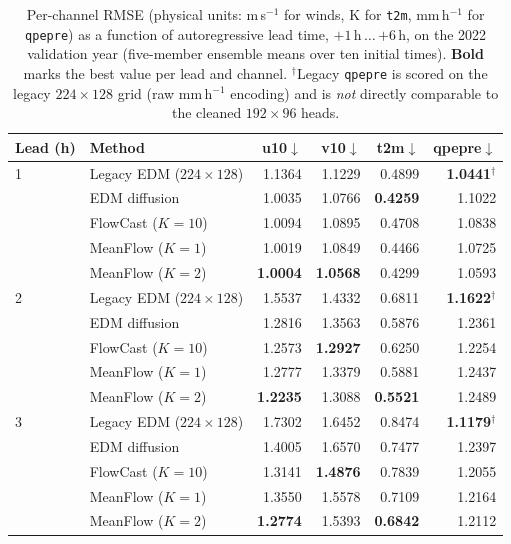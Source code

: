 \begin{table}[htbp]
  \centering
  \caption[Rollout RMSE versus lead time]{Per-channel RMSE (physical units: m\,s$^{-1}$ for winds, K for \texttt{t2m}, mm\,h$^{-1}$ for \texttt{qpepre}) as a function of autoregressive lead time, $+1$\,h\,$\ldots$\,$+6$\,h, on the 2022 validation year (five-member ensemble means over ten initial times). \textbf{Bold} marks the best value per lead and channel. $^\dagger$Legacy \texttt{qpepre} is scored on the legacy $224{\times}128$ grid (raw mm\,h$^{-1}$ encoding) and is \emph{not} directly comparable to the cleaned $192{\times}96$ heads.}
  \label{tab:rollout-rmse}
  \small
  \setlength{\tabcolsep}{5pt}
  \begin{tabular}{llrrrr}
    \toprule
    Lead (h) & Method & u10$\downarrow$ & v10$\downarrow$ & t2m$\downarrow$ & qpepre$\downarrow$ \\
    \midrule
    1 & Legacy EDM ($224{\times}128$) & 1.1364 & 1.1229 & 0.4899 & \textbf{1.0441}$^\dagger$ \\
      & EDM diffusion & 1.0035 & 1.0766 & \textbf{0.4259} & 1.1022 \\
      & FlowCast ($K{=}10$) & 1.0094 & 1.0895 & 0.4708 & 1.0838 \\
      & MeanFlow ($K{=}1$) & 1.0019 & 1.0849 & 0.4466 & 1.0725 \\
      & MeanFlow ($K{=}2$) & \textbf{1.0004} & \textbf{1.0568} & 0.4299 & 1.0593 \\
    \midrule
    2 & Legacy EDM ($224{\times}128$) & 1.5537 & 1.4332 & 0.6811 & \textbf{1.1622}$^\dagger$ \\
      & EDM diffusion & 1.2816 & 1.3563 & 0.5876 & 1.2361 \\
      & FlowCast ($K{=}10$) & 1.2573 & \textbf{1.2927} & 0.6250 & 1.2254 \\
      & MeanFlow ($K{=}1$) & 1.2777 & 1.3379 & 0.5881 & 1.2437 \\
      & MeanFlow ($K{=}2$) & \textbf{1.2235} & 1.3088 & \textbf{0.5521} & 1.2489 \\
    \midrule
    3 & Legacy EDM ($224{\times}128$) & 1.7302 & 1.6452 & 0.8474 & \textbf{1.1179}$^\dagger$ \\
      & EDM diffusion & 1.4005 & 1.6570 & 0.7477 & 1.2397 \\
      & FlowCast ($K{=}10$) & 1.3141 & \textbf{1.4876} & 0.7839 & 1.2055 \\
      & MeanFlow ($K{=}1$) & 1.3550 & 1.5578 & 0.7109 & 1.2164 \\
      & MeanFlow ($K{=}2$) & \textbf{1.2774} & 1.5393 & \textbf{0.6842} & 1.2112 \\

\end{tabular}
\end{table}
